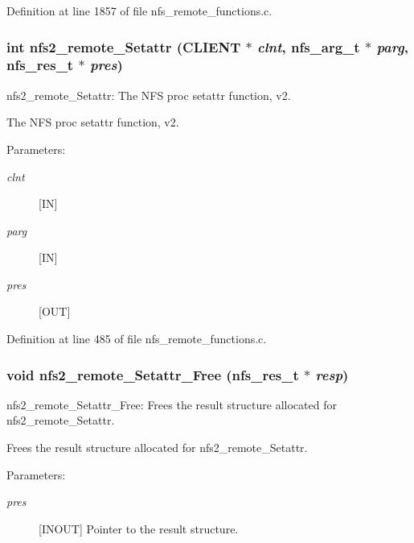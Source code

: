 Definition at line 1857 of file nfs\_\-remote\_\-functions.c.
\subsubsection[{nfs2\_\-remote\_\-Setattr}]{\setlength{\rightskip}{0pt plus 5cm}int nfs2\_\-remote\_\-Setattr (CLIENT $\ast$ {\em clnt}, \/  nfs\_\-arg\_\-t $\ast$ {\em parg}, \/  nfs\_\-res\_\-t $\ast$ {\em pres})}\label{group__NFSprocs_g68646f70e50ecab0c5d4ff54476b1e8b}


nfs2\_\-remote\_\-Setattr: The NFS proc setattr function, v2.

The NFS proc setattr function, v2.

\begin{Desc}
\item[Parameters:]
\begin{description}
\item[{\em clnt}][IN] \item[{\em parg}][IN] \item[{\em pres}][OUT] \end{description}
\end{Desc}


Definition at line 485 of file nfs\_\-remote\_\-functions.c.
\subsubsection[{nfs2\_\-remote\_\-Setattr\_\-Free}]{\setlength{\rightskip}{0pt plus 5cm}void nfs2\_\-remote\_\-Setattr\_\-Free (nfs\_\-res\_\-t $\ast$ {\em resp})}\label{group__NFSprocs_g0e20b7aa830b3be41bb0c801b2b3b963}


nfs2\_\-remote\_\-Setattr\_\-Free: Frees the result structure allocated for nfs2\_\-remote\_\-Setattr.

Frees the result structure allocated for nfs2\_\-remote\_\-Setattr.

\begin{Desc}
\item[Parameters:]
\begin{description}
\item[{\em pres}][INOUT] Pointer to the result structure. \end{description}
\end{Desc}


